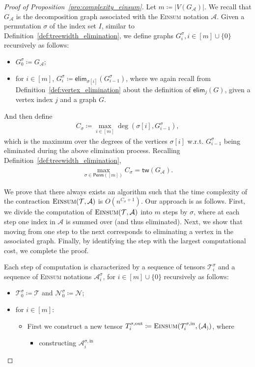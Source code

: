 \documentclass[12pt]{article}
\theoremstyle{plain}
\theoremstyle{definition}
\def\Einsum{\textsc{Einsum}}
\newcommand{\perm}[1]{\mathsf{Perm}(#1)}
\newcommand{\tensorcontraction}{\textsc{Einsum}}
\newcommand{\degp}[2]{\deg(#1,#2)}
\newcommand{\verticesp}[1]{V(#1)}
\newcommand{\treewidthp}[1]{\mathsf{tw}(#1)}
\newcommand{\less}{O}
\newcommand{\eliminatevg}[2]{\mathsf{elim}_{#1}(#2)}
\def\calA{\mathcal{A}}
\def\calT{\mathcal{T}}
\def\calN{\mathcal{N}}
\begin{document}
\begin{bibunit}[agsm]
\iffalse
\begin{proof}[Proof of Proposition~\ref{pro:complexity_einsum}]
Let $m \coloneqq |\verticesp{G_\calA}|$. We recall that $G_{\calA}$ is the decomposition graph associated with the \Einsum{} notation $\calA$. Given a permutation $\sigma$ of the index set $I$, similar to Definition~\ref{def:treewidth_elimination}, we define graphs $G^\sigma_i, i \in [m] \cup \{0\}$ recursively as follows: 
\begin{itemize}
\item $G^\sigma_0 \coloneqq G_\calA$;
\item for $i \in [m]$, $G^\sigma_i \coloneqq \eliminatevg{\sigma[i]}{G^\sigma_{i-1}}$,  
where we again recall from Definition~\ref{def:vertex_elimination} about the definition of $\eliminatevg{j}{G}$, given a vertex index $j$ and a graph $G$.
\end{itemize}
And then define
\begin{align*}
C_\sigma \coloneqq \max_{i\in[m]}\degp{\sigma[i]}{G^\sigma_{i-1}},
\end{align*}
which is the maximum over the degrees of the vertices $\sigma[i]$ w.r.t. $G_{i - 1}^{\sigma}$ being eliminated during the above elimination process. Recalling Definition~\ref{def:treewidth_elimination}, 
\begin{align*}
    \max_{\sigma \in \perm{[m]}}C_\sigma = \treewidthp{G_\calA}. 
\end{align*}

We prove that there always exists an algorithm such that the time complexity of the contraction $\tensorcontraction(\calT, \calA)$ is $\less(n^{C_\sigma + 1})$. Our approach is as follows. First, we divide the computation of $\tensorcontraction(\calT,\calA)$ into $m$ steps by $\sigma$, where at each step one index in $\calA$ is summed over (and thus eliminated). Next, we show that moving from one step to the next corresponds to eliminating a vertex in the associated graph. Finally, by identifying the step with the largest computational cost, we complete the proof.

Each step of computation is characterized by a sequence of tensors $\calT^\sigma_i$ and a sequence of \Einsum{} notations $ \calA^\sigma_i$, for $i \in [m] \cup \{0\}$ recursively as follows:
\begin{itemize}
\item $\calT^\sigma_0 \coloneqq \calT$ and $\calN^\sigma_0 \coloneqq \calN$;

\item for $i \in [m]$:
\begin{itemize}
    \item First we construct a new tensor $T_{i}^{\sigma,\mathrm{out}} \coloneqq \tensorcontraction(\calT_i^{\sigma,\mathrm{in}}, (\calA_))$, where
    \begin{itemize}
        \item constructing $\calA^{\sigma, \mathrm{in}}_i$ 
    \end{itemize}
\end{itemize}
\end{itemize}



\end{proof}
\end{bibunit}
\end{document}
